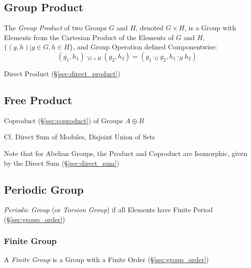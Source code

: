 \subsection{Group Product}\label{sec:group_product}

The \emph{Group Product} of two Groups $G$ and $H$, denoted $G \times
H$, is a Group with Elements from the Cartesian Product of the
Elements of $G$ and $H$, $\{(g,h) | g \in G, h \in H\}$, and Group
Operation defined Componentwise:
\[
    (g_1, h_1) \cdot_{G \times H} (g_2, h_2)
    = (g_1 \cdot_G g_2, h_1 \cdot_H h_2)
\]

Direct Product (\S\ref{sec:direct_product})



\subsection{Free Product}\label{sec:free_product}

Coproduct (\S\ref{sec:coproduct}) of Groups $A \oplus B$

\fist Cf. Direct Sum of Modules, Disjoint Union of Sets

\fist Note that for Abelian Groups, the Product and Coproduct
are Isomorphic, given by the Direct Sum (\S\ref{sec:direct_sum})



\subsection{Periodic Group}\label{sec:periodic_group}

\emph{Periodic Group} (or \emph{Torsion Group}) if all Elements have
Finite Period (\S\ref{sec:group_order})



\subsubsection{Finite Group}\label{sec:finite_group}

A \emph{Finite Group} is a Group with a Finite Order
(\S\ref{sec:group_order})

